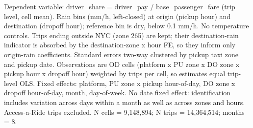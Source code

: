 \par \raggedright 
Dependent variable: driver\_share = driver\_pay / base\_passenger\_fare (trip level, cell mean). Rain bins (mm/h, left-closed) at origin (pickup hour) and destination (dropoff hour); reference bin is dry, below 0.1 mm/h. No temperature controls. Trips ending outside NYC (zone 265) are kept; their destination-rain indicator is absorbed by the destination-zone x hour FE, so they inform only origin-rain coefficients. Standard errors two-way clustered by pickup taxi zone and pickup date. Observations are OD cells (platform x PU zone x DO zone x pickup hour x dropoff hour) weighted by trips per cell, so estimates equal trip-level OLS. Fixed effects: platform, PU zone x pickup hour-of-day, DO zone x dropoff hour-of-day, month, day-of-week. No date fixed effect: identification includes variation across days within a month as well as across zones and hours. Access-a-Ride trips excluded. N cells = 9,148,894; N trips = 14,364,514; months = 8.
\par\endgroup


\ifdefined\ifclassloaded
{}
\fi
